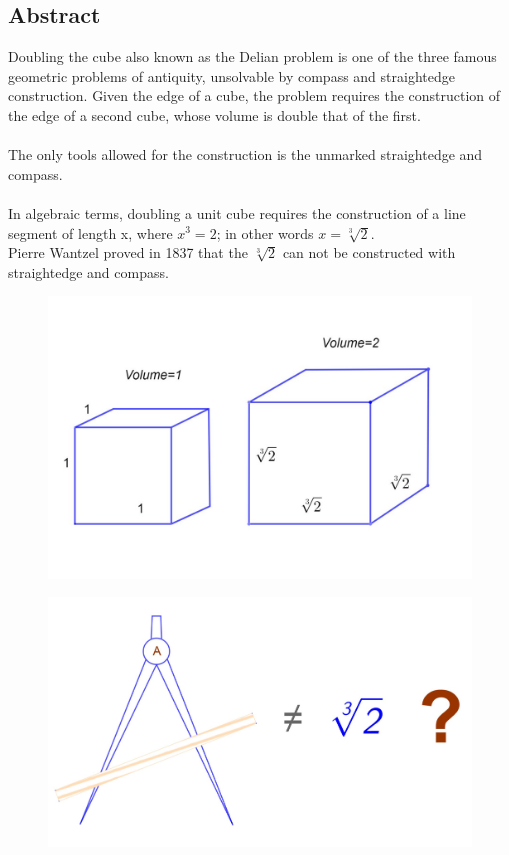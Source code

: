 \documentclass[12pt, letterpaper, oneside]{report}
\begin{document}
\begin{center}
\section*{Abstract}
\end{center}
Doubling the cube also known as the Delian problem is one of the three famous geometric problems of antiquity, unsolvable by compass and straightedge construction. Given the edge of a cube, the problem requires the construction of the edge of a second cube, whose volume is double that of the first.\\
\\
The only tools allowed for the construction is the unmarked straightedge and compass.\\
\\
In algebraic terms, doubling a unit cube requires the construction of a line segment of length x, where $x^{3} = 2$; in other words $x =\sqrt[3]{2}$.\\
Pierre Wantzel proved in 1837 that the $\sqrt[3]{2}$ can not be constructed with straightedge and compass.\cite{A} \\ 
\begin{figure}[h]
	\centering
	\includegraphics[width=0.7\linewidth]{cubes.jpg}
	\label{fig:cubes}
\end{figure}
\begin{figure}[h]
	\centering
	\includegraphics[width=0.8\linewidth]{compass.jpg}
	\label{fig:compass}
\end{figure}
\newpage
\end{document}
